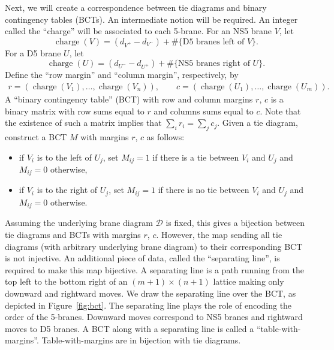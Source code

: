 \documentclass[11pt]{article}
\numberwithin{equation}{section}
\newcommand{\brane}{\mathcal D}
\DeclareMathOperator{\charge}{charge}
\begin{document}
Next, we will create a correspondence between tie diagrams and binary contingency tables (BCTs). An intermediate notion will be required. An integer called the ``charge'' will be associated to each 5-brane.
For an NS5 brane $V$, let
\[
\charge(V)=
(d_{V^+}-d_{V^-})+\#\{\text{D5 branes left of $V$}\}.
\]
For a D5 brane $U$, let
\[
\charge(U)=
(d_{U^-}-d_{U^+})+\#\{\text{NS5 branes right of $U$}\}.
\]
Define the ``row margin'' and ``column margin'', respectively, by
\begin{align*}
r = (\charge(V_1), \dots , \charge(V_n)), \qquad
c = (\charge(U_1), \dots , \charge(U_m)).
\end{align*}
A ``binary contingency table'' (BCT) with row and column margins $r$, $c$ is a binary matrix with row sums equal to $r$ and columns sums equal to $c$. Note that the existence of such a matrix implies that $\sum_i r_i = \sum_j c_j$. Given a tie diagram, construct a BCT $M$ with margins $r$, $c$ as follows:
\begin{itemize}\itemsep=0pt
\item if $V_i$ is to the left of $U_j$, set $M_{ij} = 1$ if there is a tie between $V_i$ and $U_j$ and $M_{ij} = 0$ otherwise,
\item if $V_i$ is to the right of $U_j$, set $M_{ij} = 1$ if there is no tie between $V_i$ and $U_j$ and $M_{ij} = 0$ otherwise.
\end{itemize}
Assuming the underlying brane diagram $\brane$ is fixed, this gives a bijection between tie diagrams and BCTs with margins $r$, $c$. However, the map sending all tie diagrams (with arbitrary underlying brane diagram) to their corresponding BCT is not injective. An additional piece of data, called the ``separating line'', is required to make this map bijective. A separating line is a path running from the top left to the bottom right of an $(m + 1) \times (n + 1)$ lattice making only downward and rightward moves. We draw the separating line over the BCT, as depicted in Figure~\ref{fig:bct}. The separating line plays the role of encoding the order of the 5-branes. Downward moves correspond to NS5 branes and rightward moves to D5 branes. A BCT along with a separating line is called a ``table-with-margins''. Table-with-margins are in bijection with tie diagrams.
\end{document}

